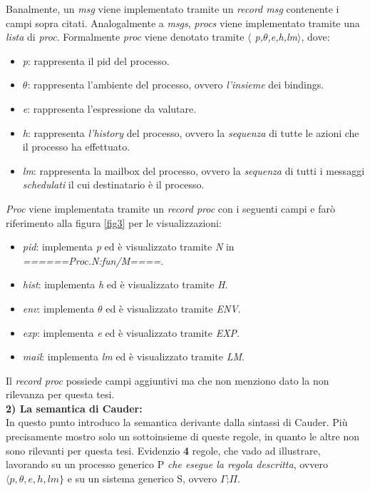 \documentclass[background.tex]{subfiles}
\begin{document}
Banalmente, un \textit{msg} viene implementato tramite un \textit{record msg} contenente i campi sopra citati.
Analogalmente a \textit{msgs}, \textit{procs} viene implementato tramite una \textit{lista} di \textit{proc}.
Formalmente \textit{proc} viene denotato tramite \textit{$\langle$ p,$\theta$,e,h,lm$\rangle$}, dove:
	\begin{itemize}
		\item \textit{p}: rappresenta il pid del processo.
		\item \textit{$\theta$}: rappresenta l'ambiente del processo, ovvero \textit{l'insieme} dei bindings.
		\item \textit{e}: rappresenta l'espressione da valutare.
		\item \textit{h}: rappresenta \textit{l'history} del processo, ovvero la \textit{sequenza} di tutte le azioni che il processo ha effettuato.
		\item \textit{lm}: rappresenta la mailbox del processo, ovvero la \textit{sequenza} di tutti i messaggi \textit{schedulati} il cui destinatario è il processo.
	\end{itemize}
\textit{Proc} viene implementata tramite un \textit{record proc} con i seguenti campi e farò riferimento alla figura \ref{fig3} per le visualizzazioni:
	\begin{itemize}
		\item \textit{pid}: implementa \textit{p} ed è visualizzato tramite \textit{N} in \textit{======Proc.N:fun/M====}.
		\item \textit{hist}: implementa \textit{h} ed è visualizzato tramite \textit{H}.
		\item \textit{env}: implementa \textit{$\theta$} ed è visualizzato tramite \textit{ENV}.
		\item \textit{exp}: implementa \textit{e} ed è visualizzato tramite \textit{EXP}.
		\item \textit{mail}: implementa \textit{lm} ed è visualizzato tramite \textit{LM}.
	\end{itemize}
	Il \textit{record proc} possiede campi aggiuntivi ma che non menziono dato la non rilevanza per questa tesi.\\
\textbf{2) La semantica di Cauder:}\\
In questo punto introduco la semantica derivante dalla sintassi di Cauder. Più precisamente mostro solo un sottoinsieme di queste regole, in quanto le altre non sono rilevanti per questa tesi.
Evidenzio \textbf{4} regole, che vado ad illustrare, lavorando su un processo generico P \textit{che esegue la regola descritta}, ovvero $\displaystyle \langle p,\theta,e,h,lm\}$ e su un sistema generico S, ovvero $\Gamma$;$\Pi$.\\
\end{document}

